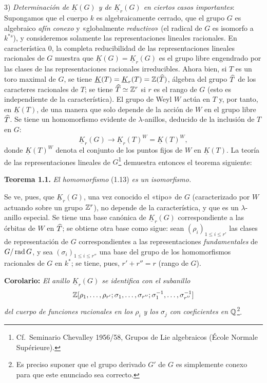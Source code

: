 3) \emph{Determinación de $\underline{K}(G)$ y de $\underline{K}_r(G)$ en ciertos casos importantes}: Supongamos que el cuerpo $k$ es algebraicamente cerrado, que el grupo $G$ es algebraico \emph{afín conexo} y «globalmente \emph{reductivo}» (el radical de $G$ es isomorfo a $k^{*s}$), y consideremos solamente las representaciones lineales racionales. En característica $0$, la completa reducibilidad de las representaciones lineales racionales de $G$ muestra que $\underline{K}(G)=\underline{K}_r(G)$ es el grupo libre engendrado por las clases de las representaciones racionales irreducibles. Ahora bien, si $T$ es un toro maximal de $G$, se tiene $\underline{K}(T)=\underline{K}_r(T)=\mathbb Z(\widehat T)$, álgebra del grupo $\widehat T$ de los caracteres racionales de $T$; se tiene $\widehat T\simeq\mathbb Z^r$ si $r$ es el rango de $G$ (esto es independiente de la característica). El grupo de Weyl $W$ actúa en $T$ y, por tanto, en $\underline{K}(T)$, de una manera que solo depende de la acción de $W$ en el grupo libre $\widehat T$. Se tiene un homomorfismo evidente de $\lambda$-anillos, deducido de la inclusión de $T$ en $G$:
\begin{equation}\tag{1.13}
\underline{K}_r(G)\longrightarrow \underline{K}_r(T)^W=\underline{K}(T)^W,
\end{equation}
donde $\underline{K}(T)^W$ denota el conjunto de los puntos fijos de $W$ en $\underline{K}(T)$. La teoría de las representaciones lineales de $G$\footnote{Cf.\ Seminario Chevalley 1956/58, Grupos de Lie algebraicos (École Normale Supérieure).} demuestra entonces el teorema siguiente:

\textbf{Teorema 1.1.} \emph{El homomorfismo} (1.13) \emph{es un isomorfismo.}

Se ve, pues, que $\underline{K}_r(G)$, una vez conocido el «tipo» de $G$ (caracterizado por $W$ actuando sobre un grupo $\mathbb Z^r$), no depende de la característica, y que es un $\lambda$-anillo especial. Se tiene una base canónica de $\underline{K}_r(G)$ correspondiente a las órbitas de $W$ en $\widehat T$; se obtiene otra base como sigue: sean $(\rho_i)_{1\leq i\leq r'}$ las clases de representación de $G$ correspondientes a las representaciones \emph{fundamentales} de $G/\operatorname{rad} G$, y sea $(\sigma_i)_{1\leq i\leq r''}$ una base del grupo de los homomorfismos racionales de $G$ en $k^*$; se tiene, pues, $r'+r''=r$ (rango de $G$).

\textbf{Corolario:} \emph{El anillo $\underline{K}_r(G)$ se identifica con el subanillo}
\[
\mathbb Z[\rho_1,\ldots,\rho_{r'};\sigma_1,\ldots,\sigma_{r''};\sigma_1^{-1},\ldots,\sigma_{r''}^{-1}]
\]
\emph{del cuerpo de funciones racionales en los $\rho_i$ y los $\sigma_j$ con coeficientes en $\mathbb Q$}\footnote{Es preciso suponer que el grupo derivado $G'$ de $G$ es simplemente conexo para que este enunciado sea correcto.}.

